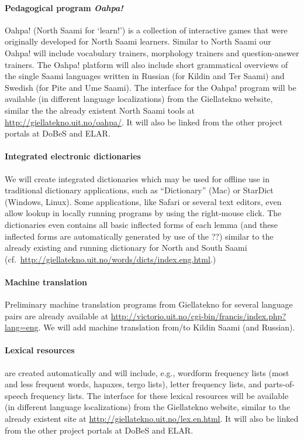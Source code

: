 \documentclass[a4paper,12pt]{article}
\begin{document}
\paragraph{Pedagogical program \textit{Oahpa!}}
Oahpa! (North Saami for ‘learn!’) is a collection of interactive games that were originally developed for North Saami learners. Similar to North Saami our Oahpa! will include vocabulary trainers, morphology trainers and question-answer trainers. The Oahpa! platform will also include short grammatical overviews of the single Saami languages written in Russian (for Kildin and Ter Saami) and Swedish (for Pite and Ume Saami). The interface for the Oahpa! program will be available (in different language localizations) from the Giellatekno website, similar the the already existent North Saami tools at \url{http://giellatekno.uit.no/oahpa/}. It will also be linked from the other project portals at DoBeS and ELAR.

\paragraph{Integrated electronic dictionaries}
We will create integrated dictionaries which may be used for offline use in traditional dictionary applications, such as “Dictionary” (Mac) or StarDict (Windows, Linux). Some applications, like Safari or several text editors, even allow lookup in locally running programs by using the right-mouse click. The dictionaries even contains all basic inflected forms of each lemma (and these inflected forms are automatically generated by use of the ??) similar to the already existing and running dictionary for North and South Saami (cf.~\url{http://giellatekno.uit.no/words/dicts/index.eng.html}.)

\paragraph{Machine translation}
Preliminary machine translation programs from Giellatekno for several language pairs are already available at \url{http://victorio.uit.no/cgi-bin/francis/index.php?lang=eng}. We will add machine translation from/to Kildin Saami (and Russian).

\paragraph{Lexical resources} are created automatically and will include, e.g., wordform frequency lists (most and less frequent words, hapaxes, tergo lists), letter frequency lists, and parts-of-speech frequency lists. The interface for these lexical resources will be available (in different language localizations) from the Giellatekno website, similar to the already existent site at \url{http://giellatekno.uit.no/lex.en.html}. It will also be linked from the other project portals at DoBeS and ELAR.
\end{document}
